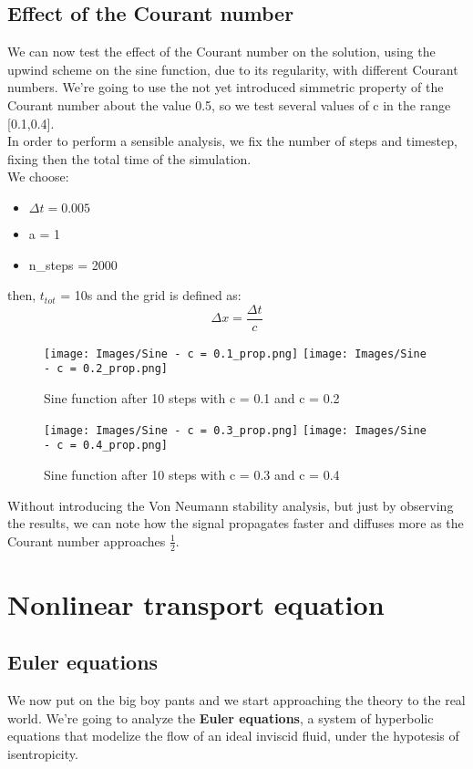 \documentclass{report}
\begin{document}
\section*{Effect of the Courant number}
We can now test the effect of the Courant number on the solution, using the upwind scheme on the sine function, due to its regularity, with different Courant numbers.
We're going to use the not yet introduced simmetric property of the Courant number about the value 0.5, so we test several values of c in the range [0.1,0.4].\\
In order to perform a sensible analysis, we fix the number of steps and timestep, fixing then the total time of the simulation.\\
We choose:
\begin{itemize}[label={}]
    \item $\Delta t = 0.005$
    \item a = 1
    \item n\_steps = 2000
\end{itemize}
then, $t_{tot}$ = 10s and the grid is defined as:
\begin{equation*}
    \Delta x = \frac{\Delta t}{c}
\end{equation*}
\begin{figure}[H]
    \centering
    \texttt{[image: Images/Sine - c = 0.1\_prop.png]}
    \texttt{[image: Images/Sine - c = 0.2\_prop.png]}
    \caption{Sine function after 10 steps with c = 0.1 and c = 0.2}
    \label{fig:sine_res_c}
\end{figure}
\begin{figure}[H]
    \centering
    \texttt{[image: Images/Sine - c = 0.3\_prop.png]}
    \texttt{[image: Images/Sine - c = 0.4\_prop.png]}
    \caption{Sine function after 10 steps with c = 0.3 and c = 0.4}
    \label{fig:sine_res_c2}
\end{figure}

Without introducing the Von Neumann stability analysis, but just by observing the results, we can note
how the signal propagates faster and diffuses more as the Courant number approaches $\frac{1}{2}$.

\chapter*{Nonlinear transport equation}
\section*{Euler equations}
We now put on the big boy pants and we start approaching the theory to the real world.
We're going to analyze the \textbf{Euler equations}, a system of hyperbolic equations that modelize the flow of an ideal inviscid fluid, under the hypotesis of isentropicity.
\end{document}
